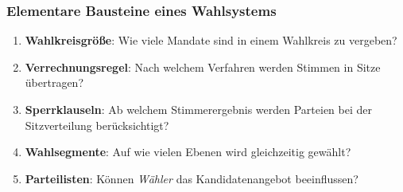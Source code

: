 \documentclass{beamer}
\begin{document}
\begin{frame}
\frametitle{Elementare Bausteine eines Wahlsystems}
\begin{enumerate}
  \item \textbf{Wahlkreisgröße}: Wie viele Mandate sind in einem Wahlkreis zu vergeben?
  \item \textbf{Verrechnungsregel}: Nach welchem Verfahren werden Stimmen in Sitze übertragen?
  \item \textbf{Sperrklauseln}: Ab welchem Stimmerergebnis werden Parteien bei der Sitzverteilung berücksichtigt?
  \item \textbf{Wahlsegmente}: Auf wie vielen Ebenen wird gleichzeitig gewählt?
  \item \textbf{Parteilisten}: Können \textit{Wähler} das Kandidatenangebot beeinflussen?
\end{enumerate}
\end{frame}
\end{document}
